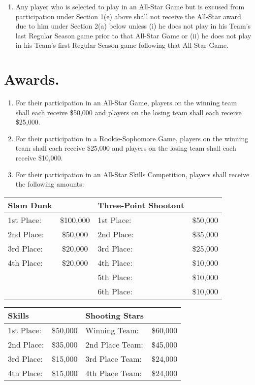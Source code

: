 \documentclass[
]{book}
\providecommand{\tightlist}{%
  \setlength{\itemsep}{0pt}\setlength{\parskip}{0pt}}
\begin{document}
\begin{enumerate}
\item
  Any player who is selected to play in an All-Star Game but is excused from participation under Section 1(e) above shall not receive the All-Star award due to him under Section 2(a) below unless (i) he does not play in his Team's last Regular Season game prior to that All-Star Game or (ii) he does not play in his Team's first Regular Season game following that All-Star Game.
\end{enumerate}

\hypertarget{awards.}{%
\section{Awards.}\label{awards.}}

\begin{enumerate}
\def\labelenumi{(\alph{enumi})}
\tightlist
\item
  For their participation in an All-Star Game, players on the winning team shall each receive \$50,000 and players on the losing team shall each receive \$25,000.
\item
  For their participation in a Rookie-Sophomore Game, players on the winning team shall each receive \$25,000 and players on the losing team shall each receive \$10,000.
\item
  For their participation in an All-Star Skills Competition, players shall receive the following amounts:
\end{enumerate}

\begin{longtable}[]{@{}lclc@{}}
\toprule()
Slam Dunk & & Three-Point Shootout & \\
\midrule()
\endhead
1st Place: & \$100,000 & 1st Place: & \$50,000 \\
2nd Place: & \$50,000 & 2nd Place: & \$35,000 \\
3rd Place: & \$20,000 & 3rd Place: & \$25,000 \\
4th Place: & \$20,000 & 4th Place: & \$10,000 \\
& & 5th Place: & \$10,000 \\
& & 6th Place: & \$10,000 \\
\bottomrule()
\end{longtable}

\begin{longtable}[]{@{}lclc@{}}
\toprule()
Skills & & Shooting Stars & \\
\midrule()
\endhead
1st Place: & \$50,000 & Winning Team: & \$60,000 \\
2nd Place: & \$35,000 & 2nd Place Team: & \$45,000 \\
3rd Place: & \$15,000 & 3rd Place Team: & \$24,000 \\
4th Place: & \$15,000 & 4th Place Team: & \$24,000 \\
\bottomrule()
\end{longtable}
\end{document}
